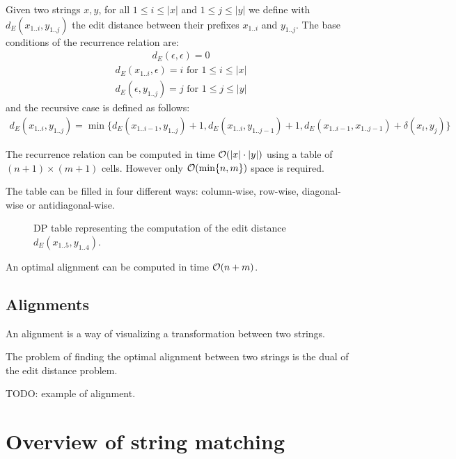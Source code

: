 Given two strings $x,y$, for all $1 \leq i \leq | x |$ and $1 \leq j \leq | y |$ we define with $d_E(x_{1..i},y_{1..j})$ the edit distance between their prefixes $x_{1..i}$ and $y_{1..j}$.
The base conditions of the recurrence relation are:
\begin{eqnarray}
d_E(\epsilon,\epsilon) = 0
\end{eqnarray}
\begin{eqnarray}
d_E(x_{1..i},\epsilon) = i \text{ for } 1 \leq i \leq | x |
\end{eqnarray}
\begin{eqnarray}
d_E(\epsilon, y_{1..j}) = j \text{ for } 1 \leq j \leq | y |
\end{eqnarray}
and the recursive case is defined as follows:
\begin{eqnarray}
d_E(x_{1..i},y_{1..j}) = \min \{ d_E(x_{1..i-1},y_{1..j})+1, d_E(x_{1..i},y_{1..j-1})+1, d_E(x_{1..i-1},x_{1..j-1}) + \delta(x_i, y_j)\}
\end{eqnarray}

The recurrence relation can be computed in time $\mathcal{O}(| x | \cdot | y |)$ using a table of $(n+1) \times (m+1)$ cells. However only $\mathcal{O}(\text{min}\{ n, m \})$ space is required.

The table can be filled in four different ways: column-wise, row-wise, diagonal-wise or antidiagonal-wise.

\begin{figure}[h]
\caption{DP table representing the computation of the edit distance $d_E(x_{1..5}, y_{1..4})$.}
\label{fig:edit-dp}
\end{figure}

An optimal alignment can be computed in time $\mathcal{O}(n + m)$.

\subsection{Alignments}

An alignment is a way of visualizing a transformation between two strings.

The problem of finding the optimal alignment between two strings is the dual of the edit distance problem.

\begin{example}
TODO: example of alignment.
\end{example}


\section{Overview of string matching}

